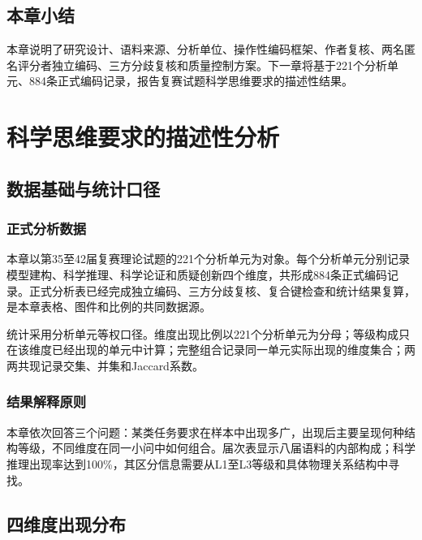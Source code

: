 \documentclass[
  12pt,
  a4paper,twoside,openany]{ctexbook}
\begin{document}
\section{本章小结}\label{ux672cux7ae0ux5c0fux7ed3-2}

本章说明了研究设计、语料来源、分析单位、操作性编码框架、作者复核、两名匿名评分者独立编码、三方分歧复核和质量控制方案。下一章将基于221个分析单元、884条正式编码记录，报告复赛试题科学思维要求的描述性结果。

\chapter{科学思维要求的描述性分析}\label{ux79d1ux5b66ux601dux7ef4ux8981ux6c42ux7684ux63cfux8ff0ux6027ux5206ux6790}

\section{数据基础与统计口径}\label{ux6570ux636eux57faux7840ux4e0eux7edfux8ba1ux53e3ux5f84}

\subsection{正式分析数据}\label{ux6b63ux5f0fux5206ux6790ux6570ux636e}

本章以第35至42届复赛理论试题的221个分析单元为对象。每个分析单元分别记录模型建构、科学推理、科学论证和质疑创新四个维度，共形成884条正式编码记录。正式分析表已经完成独立编码、三方分歧复核、复合键检查和统计结果复算，是本章表格、图件和比例的共同数据源。

统计采用分析单元等权口径。维度出现比例以221个分析单元为分母；等级构成只在该维度已经出现的单元中计算；完整组合记录同一单元实际出现的维度集合；两两共现记录交集、并集和Jaccard系数。

\subsection{结果解释原则}\label{ux7ed3ux679cux89e3ux91caux539fux5219}

本章依次回答三个问题：某类任务要求在样本中出现多广，出现后主要呈现何种结构等级，不同维度在同一小问中如何组合。届次表显示八届语料的内部构成；科学推理出现率达到100\%，其区分信息需要从L1至L3等级和具体物理关系结构中寻找。

\section{四维度出现分布}\label{ux56dbux7ef4ux5ea6ux51faux73b0ux5206ux5e03}
\end{document}
